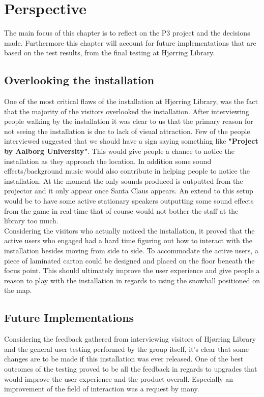 \chapter{Perspective}
The main focus of this chapter is to reflect on the P3 project and the decisions made. Furthermore this chapter will account for future implementations that are based on the test results, from the final testing at Hj{\o}rring Library.
\section{Overlooking the installation}
One of the most critical flaws of the installation at Hj{\o}rring Library, was the fact that the majority of the visitors overlooked the installation. After interviewing people walking by the installation it was clear to us that the primary reason for not seeing the installation is due to lack of visual attraction. Few of the people interviewed suggested that we should have a sign saying something like \textbf{"Project by Aalborg University"}. This would give people a chance to notice the installation as they approach the location. In addition some sound effects/background music would also contribute in helping people to notice the installation. At the moment the only sounds produced is outputted from the projector and it only appear once Santa Claus appears. An extend to this setup would be to have some active stationary speakers outputting some sound effects from the game in real-time that of course would not bother the staff at the library too much.\\
Considering the visitors who actually noticed the installation, it proved that the active users who engaged had a hard time figuring out how to interact with the installation besides moving from side to side. To accommodate the active users, a piece of laminated carton could be designed and placed on the floor beneath the focus point. This should ultimately improve the user experience and give people a reason to play with the installation in regards to using the snowball positioned on the map.\\
\section{Future Implementations}
Considering the feedback gathered from interviewing visitors of Hj{\o}rring Library and the general user testing performed by the group itself, it's clear that some changes are to be made if this installation was ever released. One of the best outcomes of the testing proved to be all the feedback in regards to upgrades that would improve the user experience and the product overall. Especially an improvement of the field of interaction was a request by many.  
